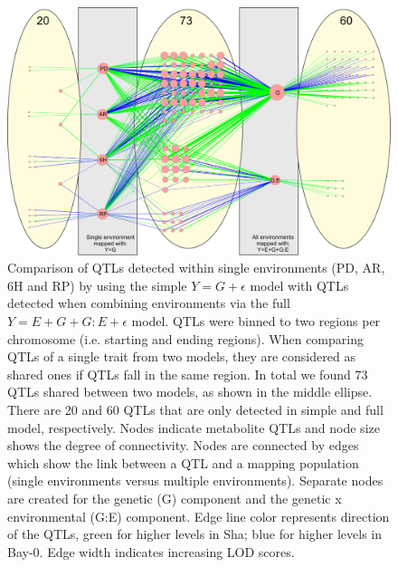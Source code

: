 \begin{figure}[!ht]
  \centering
  \includegraphics[keepaspectratio,scale=0.30]{eps/image_3_2_2.eps}
  \caption[Comparison of QTLs detected]{Comparison of QTLs detected within single environments (PD, AR, 
          6H and RP) by using the simple $Y=G+\epsilon$ model with QTLs detected when combining environments via the full 
          $Y=E+G+G:E+\epsilon$ model. QTLs were binned to two regions per chromosome (i.e. starting and ending regions).  
          When comparing QTLs of a single trait from two models, they are considered as shared ones  if QTLs fall 
          in the same region. In total we found 73 QTLs shared between two models, as shown in the middle ellipse. 
          There are 20 and 60 QTLs that are only detected in simple and full model, respectively. Nodes indicate 
          metabolite QTLs and node size shows the degree of connectivity. Nodes are connected by edges which show 
          the link between a QTL and a mapping population (single environments versus multiple environments). 
          Separate nodes are created for the genetic (G) component and the genetic x environmental (G:E) component. 
          Edge line color represents direction of the QTLs, green for higher levels in Sha; blue for higher levels 
          in Bay-0. Edge width indicates increasing LOD scores.}
          \label{fig:qtlComparison}
\end{figure}

